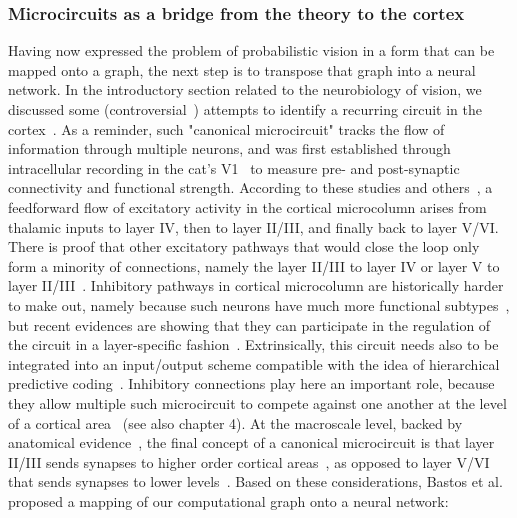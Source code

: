 \subsubsection{Microcircuits as a bridge from the theory to the cortex}
Having now expressed the problem of probabilistic vision in a form that can be mapped onto a graph, the next step is to transpose that graph into a neural network. In the introductory section related to the neurobiology of vision, we discussed some (controversial~\cite{horton2005cortical}) attempts to identify a recurring circuit in the cortex~\cite{douglas1989canonical, douglas2004neuronal}. As a reminder, such "canonical microcircuit" tracks the flow of information through multiple neurons, and was first established through intracellular recording in the cat's \gls{V1}~\cite{douglas1989canonical} to measure pre- and post-synaptic connectivity and functional strength. According to these studies and others~\cite{thomson2002synaptic}, a feedforward flow of excitatory activity in the cortical microcolumn arises from thalamic inputs to layer IV, then to layer II/III, and finally back to layer V/VI. There is proof that other excitatory pathways that would close the loop only form a minority of connections, namely the layer II/III to layer IV or layer V to layer II/III~\cite{thomson2002synaptic}. Inhibitory pathways in cortical microcolumn are historically harder to make out, namely because such neurons have much more functional subtypes~\cite{gouwens2019classification}, but recent evidences are showing that they can participate in the regulation of the circuit in a layer-specific fashion~\cite{bugeon2022transcriptomic}. Extrinsically, this circuit needs also to be integrated into an input/output scheme compatible with the idea of hierarchical predictive coding~\cite{boutin2022pooling}. Inhibitory connections play here an important role, because they allow multiple such microcircuit to compete against one another at the level of a cortical area~\cite{coultrip1992cortical, chavane2022revisiting} (see also chapter 4). At the macroscale level, backed by anatomical evidence~\cite{markov2014anatomy}, the final concept of a canonical microcircuit is that layer II/III sends synapses to higher order cortical areas~\cite{felleman1991distributed}, as opposed to layer V/VI that sends synapses to lower levels~\cite{markov2011weight}. Based on these considerations, Bastos et al.~\cite{bastos2012canonical} proposed a mapping of our computational graph onto a neural network:

